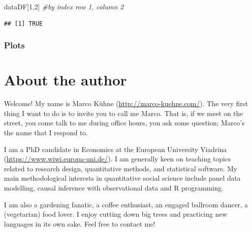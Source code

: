 \documentclass[
]{book}
\newenvironment{Shaded}{\begin{snugshade}}{\end{snugshade}}
\newcommand{\CommentTok}[1]{\textcolor[rgb]{0.56,0.35,0.01}{\textit{#1}}}
\newcommand{\DecValTok}[1]{\textcolor[rgb]{0.00,0.00,0.81}{#1}}
\newcommand{\NormalTok}[1]{#1}
\begin{document}
\begin{Shaded}
\begin{Highlighting}[]
\NormalTok{dataDF[}\DecValTok{1}\NormalTok{,}\DecValTok{2}\NormalTok{] }\CommentTok{\#by index row 1, column 2}
\end{Highlighting}
\end{Shaded}

\begin{verbatim}
## [1] TRUE
\end{verbatim}

\hypertarget{plots}{%
\subsection*{Plots}\label{plots}}

\hypertarget{about-the-author}{%
\chapter*{About the author}\label{about-the-author}}

Welcome! My name is Marco Kühne (\url{http://marco-kuehne.com/}). The very first thing I want to do is to invite you to call me Marco. That is, if we meet on the street, you come talk to me during office hours, you ask some question; Marco's the name that I respond to.

I am a PhD candidate in Economics at the European University Viadrina (\url{https://www.wiwi.europa-uni.de/}). I am generally keen on teaching topics related to research design, quantitative methods, and statistical software. My main methodological interests in quantitative social science include panel data modelling, causal inference with observational data and R programming.

I am also a gardening fanatic, a coffee enthusiast, an engaged ballroom dancer, a (vegetarian) food lover. I enjoy cutting down big trees and practicing new languages in its own sake. Feel free to contact me!
\end{document}
